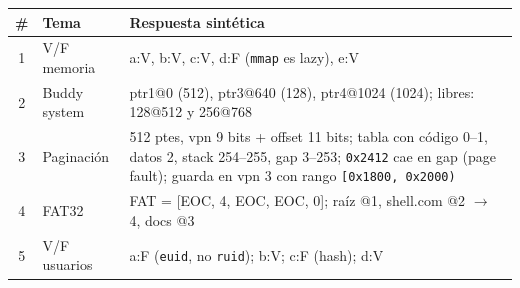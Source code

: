 \documentclass[11pt,a4paper]{article}
\begin{document}
\begin{center}
\small
\begin{tabular}{@{}clp{8.5cm}@{}}
\toprule
\# & Tema & Respuesta sintética \\
\midrule
1 & V/F memoria        & a:V, b:V, c:V, d:F (\texttt{mmap} es lazy), e:V \\
2 & Buddy system        & ptr1@0 (512), ptr3@640 (128), ptr4@1024 (1024); libres: 128@512 y 256@768 \\
3 & Paginación          & 512 ptes, vpn 9 bits + offset 11 bits; tabla con código 0--1, datos 2, stack 254--255, gap 3--253; \texttt{0x2412} cae en gap (page fault); guarda en vpn 3 con rango \texttt{[0x1800, 0x2000)} \\
4 & FAT32               & FAT = [EOC, 4, EOC, EOC, 0]; raíz @1, shell.com @2 $\to$ 4, docs @3 \\
5 & V/F usuarios        & a:F (\texttt{euid}, no \texttt{ruid}); b:V; c:F (hash); d:V \\
\bottomrule
\end{tabular}
\end{center}
\end{document}
